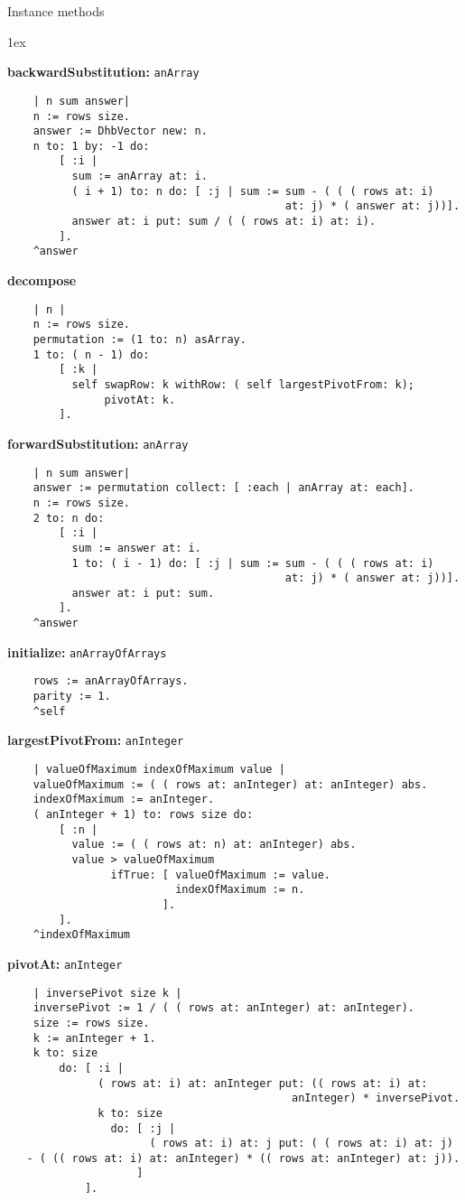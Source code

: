 Instance methods
{\parskip 1ex\par\noindent}
{\bf backwardSubstitution:} {\tt anArray}
\begin{verbatim}
    | n sum answer|
    n := rows size.
    answer := DhbVector new: n.
    n to: 1 by: -1 do:
        [ :i |
          sum := anArray at: i.
          ( i + 1) to: n do: [ :j | sum := sum - ( ( ( rows at: i) 
                                           at: j) * ( answer at: j))].
          answer at: i put: sum / ( ( rows at: i) at: i).
        ].
    ^answer

\end{verbatim}
{\bf decompose}
\begin{verbatim}
    | n |
    n := rows size.
    permutation := (1 to: n) asArray.
    1 to: ( n - 1) do:
        [ :k |
          self swapRow: k withRow: ( self largestPivotFrom: k);
               pivotAt: k.
        ].

\end{verbatim}
{\bf forwardSubstitution:} {\tt anArray}
\begin{verbatim}
    | n sum answer|
    answer := permutation collect: [ :each | anArray at: each].
    n := rows size.
    2 to: n do:
        [ :i |
          sum := answer at: i.
          1 to: ( i - 1) do: [ :j | sum := sum - ( ( ( rows at: i) 
                                           at: j) * ( answer at: j))].
          answer at: i put: sum.
        ].
    ^answer

\end{verbatim}
{\bf initialize:} {\tt anArrayOfArrays}
\begin{verbatim}
    rows := anArrayOfArrays.
    parity := 1.
    ^self

\end{verbatim}
{\bf largestPivotFrom:} {\tt anInteger}
\begin{verbatim}
    | valueOfMaximum indexOfMaximum value |
    valueOfMaximum := ( ( rows at: anInteger) at: anInteger) abs.
    indexOfMaximum := anInteger.
    ( anInteger + 1) to: rows size do:
        [ :n |
          value := ( ( rows at: n) at: anInteger) abs.
          value > valueOfMaximum
                ifTrue: [ valueOfMaximum := value.
                          indexOfMaximum := n.
                        ].
        ].
    ^indexOfMaximum 

\end{verbatim}
{\bf pivotAt:} {\tt anInteger}
\begin{verbatim}
    | inversePivot size k |
    inversePivot := 1 / ( ( rows at: anInteger) at: anInteger).
    size := rows size.
    k := anInteger + 1.
    k to: size
        do: [ :i |
              ( rows at: i) at: anInteger put: (( rows at: i) at: 
                                            anInteger) * inversePivot.
              k to: size
                do: [ :j |
                      ( rows at: i) at: j put: ( ( rows at: i) at: j) 
   - ( (( rows at: i) at: anInteger) * (( rows at: anInteger) at: j)).
                    ]
            ].

\end{verbatim}
